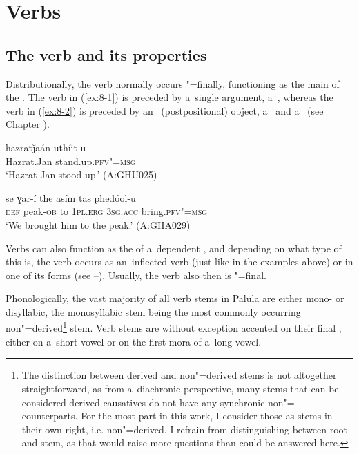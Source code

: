 \chapter{Verbs}
\label{chap:8}

\section{The verb and its properties}
\label{sec:8-1}



Distributionally, the verb normally occurs "=finally, functioning as the main  of the . The verb in (\ref{ex:8-1}) is preceded by a~single argument, a~, whereas the verb in (\ref{ex:8-2}) is preceded by an~ (postpositional) object, a~ and a~ (see Chapter ).

\begin{exe}
\ex
\label{ex:8-1}
\gll hazratǰaán uthíit-u \\
Hazrat.Jan stand.up.\textsc{pfv"=msg} \\
\glt `Hazrat Jan stood up.' (A:GHU025)
\end{exe}
\begin{exe}
\ex
\label{ex:8-2}
\gll se ɣar-í the asím tas phedóol-u \\
\textsc{def} peak-\textsc{ob} to \textsc{1pl.erg} \textsc{3sg.acc} bring.\textsc{pfv"=msg} \\
\glt `We brought him to the peak.' (A:GHA029)
\end{exe}

Verbs can also function as the  of a~dependent , and depending on what type of  this is, the verb occurs as an~inflected  verb (just like in the examples above) or in one of its  forms (see --). Usually, the verb also then is "=final.


Phonologically, the vast majority of all verb stems in Palula are either mono- or disyllabic, the monosyllabic stem being the most commonly occurring non"=derived\footnote{The distinction between derived and non"=derived stems is not altogether straightforward, as from a~diachronic perspective, many  stems that can be considered derived causatives do not have any synchronic non"= counterparts. For the most part in this work, I consider those as stems in their own right, i.e. non"=derived. I refrain from distinguishing between root and stem, as that would raise more questions than could be answered here.} stem. Verb stems are without exception accented on their final , either on a~short vowel or on the first mora of a~long vowel. 



